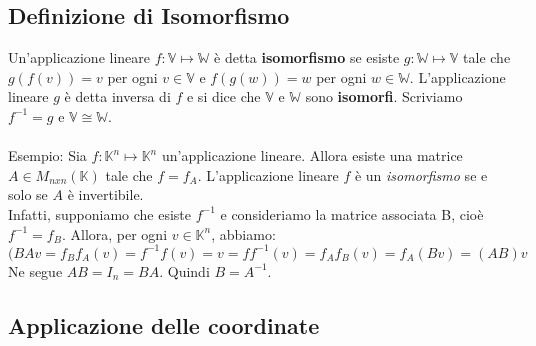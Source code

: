 \documentclass[12pt]{article}
\begin{document}
\subsection{Definizione di Isomorfismo}
Un'applicazione lineare $f: \mathbb{V} \mapsto \mathbb{W}$ è detta \textbf{isomorfismo} se esiste $g : \mathbb{W} \mapsto \mathbb{V}$ tale che $g(f(v)) = v$ per ogni $v \in \mathbb{V}$ e $f(g(w)) = w$ per ogni $w \in \mathbb{W}$. L'applicazione lineare $g$ è detta inversa di $f$ e si dice che $\mathbb{V}$ e $\mathbb{W}$ sono \textbf{isomorfi}. Scriviamo $f^{-1} = g$ e $\mathbb{V} \cong \mathbb{W}$.
\\\\
Esempio: Sia $f: \mathbb{K}^n \mapsto \mathbb{K}^n$ un'applicazione lineare. Allora esiste una matrice $A \in M_{nxn}(\mathbb{K})$ tale che $f = f_A$.
L'applicazione lineare $f$ è un \textit{isomorfismo} se e solo se $A$ è invertibile.\\
Infatti, supponiamo che esiste $f^{-1}$ e consideriamo la matrice associata B,  cioè $f^{-1} = f_B$. Allora, per ogni $v \in \mathbb{K}^n$, abbiamo:
\[(BAv = f_Bf_A(v) = f^{-1}f(v) = v = ff^{-1}(v) = f_Af_B(v) = f_A(Bv) = (AB)v\]
Ne segue $AB = I_n = BA$. Quindi $B = A^{-1}$.

\subsection{Applicazione delle coordinate}
\end{document}
